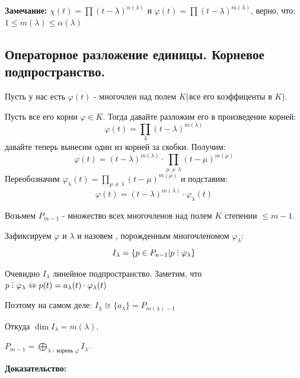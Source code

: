 \textbf{Замечание:}
$\chi(t) = \prod(t-\lambda)^{\alpha(\lambda)}$ и $\varphi(t) = \prod (t-\lambda)^{m(\lambda)}$, верно, что: $1 \leq m(\lambda)\leq \alpha(\lambda)$


\subsection{Операторное разложение единицы. Корневое подпространство.}

Пусть у нас есть $\varphi(t)$ - многочлен над полем $K$(все его коэффиценты в $K$).

 Пусть все его корни $\varphi \in K$. Тогда давайте разложим его в произведение корней:
$$\varphi(t) = \prod\limits_{\lambda} (t-\lambda)^{m(\lambda)}$$
давайте теперь вынесим один из корней за скобки. Получим:
$$\varphi(t) = (t-\lambda)^{m(\lambda)} \cdot \prod\limits_{\mu\neq \lambda}(t-\mu)^{m(\mu)}$$
Переобозначим $\varphi_{\lambda}(t) = \prod\limits_{\mu\neq \lambda}(t-\mu)^{m(\mu)}$ и подставим:
$$\varphi(t) = (t-\lambda)^{m(\lambda)} \cdot \varphi_{\lambda}(t)$$

Возьмем $P_{m-1}$ - множество всех многочленов над полем $K$ степении $\leq m-1$.

Зафиксируем $\varphi$ и $\lambda$ и назовем  , порожденным многочленомом $\varphi_\lambda$:
$$ I_{\lambda} = \{p \in P_{n-1}| p \divby \varphi _{\lambda }\}$$

Очевидно $I_{\lambda}$ линейное подпространство. Заметим, что $p \divby  \varphi_{\lambda} \Leftrightarrow p(t) = a_{\lambda}(t) \cdot \varphi_{\lambda}(t)$ 

 Поэтому на самом деле: $I_{\lambda} \cong \{a_{\lambda}\} = P_{m(\lambda)-1}$

 Откуда $\dim I_{\lambda} = m(\lambda)$.


 $P_{m-1} = \bigoplus\limits_{\lambda\text{ - корень $\varphi$}} I_{\lambda}$.

 \textbf{Доказательство:}

